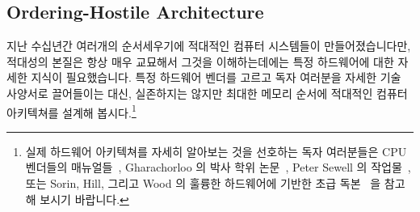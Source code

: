 \subsection{Ordering-Hostile Architecture}
\label{sec:app:whymb:Ordering-Hostile Architecture}

지난 수십년간 여러개의 순서세우기에 적대적인 컴퓨터 시스템들이
만들어졌습니다만, 적대성의 본질은 항상 매우 교묘해서 그것을 이해하는데에는 특정
하드웨어에 대한 자세한 지식이 필요했습니다.
특정 하드웨어 벤더를 고르고 독자 여러분을 자세한 기술 사양서로 끌어들이는 대신,
실존하지는 않지만 최대한 메모리 순서에 적대적인 컴퓨터 아키텍쳐를 설계해
봅시다.\footnote{
	실제 하드웨어 아키텍쳐를 자세히 알아보는 것을 선호하는 독자 여러분들은
	CPU 벤더들의
	매뉴얼들~\cite{ALPHA95,AMDOpteron02,IntelItanium02v2,PowerPC94,MichaelLyons02a,SPARC94,IntelXeonV3-96a,IntelXeonV2b-96a,IBMzSeries04a},
	Gharachorloo 의 박사 학위 논문~\cite{Gharachorloo95}, Peter Sewell 의
	작업물~\cite{PeterSewell2010weakmemory}, 또는 Sorin, Hill, 그리고 Wood
	의 훌륭한 하드웨어에 기반한 초급 독본~\cite{DanielJSorin2011MemModel}
	을 참고해 보시기 바랍니다.}

